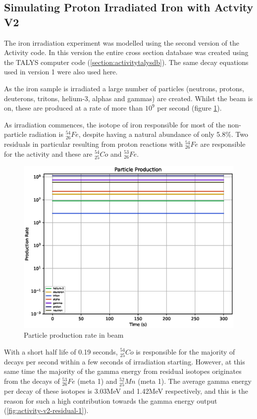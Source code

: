 \subsection{Simulating Proton Irradiated Iron with Actvity V2}

The iron irradiation experiment was modelled using the second version of the Activity code.  In this version the entire cross section database was created using the TALYS computer code (\ref{section:activitytalysdb}).  The same decay equations used in version 1 were also used here.

As the iron sample is irradiated a large number of particles (neutrons, protons, deuterons, tritons, helium-3, alphas and gammas) are created.  Whilst the beam is on, these are produced at a rate of more than $10^9$ per second (figure \ref{fig:activity-v2-particle-production}).

As irradiation commences, the isotope of iron responsible for most of the non-particle radiation is ${}^{54}_{26} Fe$, despite having a natural abundance of only 5.8\%.  Two residuals in particular resulting from proton reactions with ${}^{54}_{26} Fe$ are responsible for the activity and these are ${}^{54}_{25}Co$ and ${}^{53}_{26}Fe$.  

\begin{figure}[htb]
\centering
\includegraphics[width=0.7\linewidth]{chapters/activity_code/fe-activity-v2/particle_production_in_beam.eps}
\caption{Particle production rate in beam}
\label{fig:activity-v2-particle-production}
\end{figure}

With a short half life of 0.19 seconds, ${}^{54}_{25}Co$ is responsible for the majority of decays per second within a few seconds of irradiation starting.  However, at this same time the majority of the gamma energy from residual isotopes originates from the decays of ${}^{53}_{26}Fe$ (meta 1) and  ${}^{52}_{25}Mn$ (meta 1).  The average gamma energy per decay of these isotopes is 3.03MeV and 1.42MeV respectively, and this is the reason for such a high contribution towards the gamma energy output (\ref{fig:activity-v2-residual-1}).

